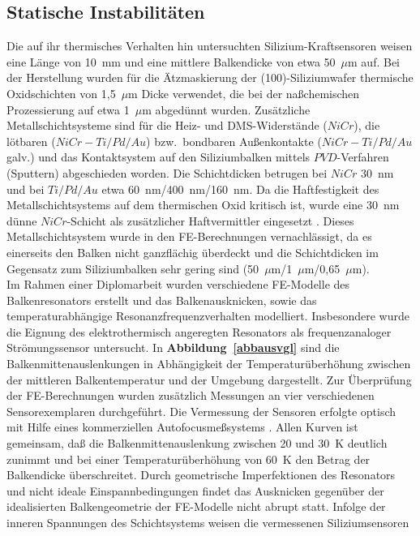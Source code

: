 \subsection{Statische Instabilitäten}

Die auf ihr thermisches Verhalten hin untersuchten Silizium-Kraftsensoren
weisen eine Länge von 10~mm und eine mittlere Balkendicke von etwa 50~$\mu$m
auf. Bei der Herstellung wurden für die Ätzmaskierung der (100)-Siliziumwafer
thermische Oxidschichten von 1,5~$\mu$m Dicke verwendet, die bei der
naßchemischen Prozessierung auf etwa 1~$\mu$m abgedünnt wurden. Zusätzliche
Metallschichtsysteme sind für die Heiz- und DMS-Widerstände
($NiCr$), die lötbaren ($NiCr-Ti/Pd/Au$) bzw.\ bondbaren Außenkontakte
($NiCr-Ti/Pd/Au$ galv.) und das Kontaktsystem auf den Siliziumbalken
mittels $PVD$-Verfahren (Sputtern) abgeschieden worden. Die Schichtdicken
betrugen bei $NiCr$ 30~nm und bei $Ti/Pd/Au$ etwa 60~nm/400~nm/160~nm.
Da die Haftfestigkeit des Metallschichtsystems auf dem thermischen Oxid
kritisch ist, wurde eine 30~nm dünne $NiCr$-Schicht als zusätzlicher
Haftvermittler eingesetzt \cite{ABV93}.
Dieses Metallschichtsystem wurde in den FE-Berechnungen vernachlässigt, da
es einerseits den Balken nicht ganzflächig überdeckt und die Schichtdicken
im Gegensatz zum Siliziumbalken sehr gering sind
(50~$\mu$m/1~$\mu$m/0,65~$\mu$m).\\
%
Im Rahmen einer Diplomarbeit \cite{Mes93} wurden verschiedene FE-Modelle
des Balkenresonators erstellt und das Balkenausknicken, sowie das
temperaturabhängige Resonanzfrequenzverhalten modelliert. Insbesondere
wurde die Eignung des elektrothermisch angeregten Resonators als
frequenzanaloger Strömungssensor untersucht.
In {\bf Abbildung~\ref{abbausvgl}} sind die Balkenmittenauslenkungen
in Abhängigkeit der Temperaturüberhöhung zwischen der mittleren
Balkentemperatur und der Umgebung dargestellt. Zur Überprüfung der
FE-Berechnungen wurden zusätzlich Messungen an vier verschiedenen
Sensorexemplaren durchgeführt. Die Vermessung der Sensoren erfolgte
optisch mit Hilfe eines kommerziellen Autofocusmeß\-systems \cite{UBM91}.
Allen Kurven ist gemeinsam, daß die Balkenmittenauslenkung zwischen 20
und 30~K deutlich zunimmt und bei einer Temperaturüberhöhung
von 60~K den Betrag der Balkendicke überschreitet.
Durch geometrische Imperfektionen des Resonators und nicht ideale
Einspannbedingungen findet das Ausknicken gegenüber der idealisierten
Balkengeometrie der FE-Modelle nicht abrupt statt. Infolge der inneren
Spannungen des Schichtsystems weisen die vermessenen Siliziumsensoren
